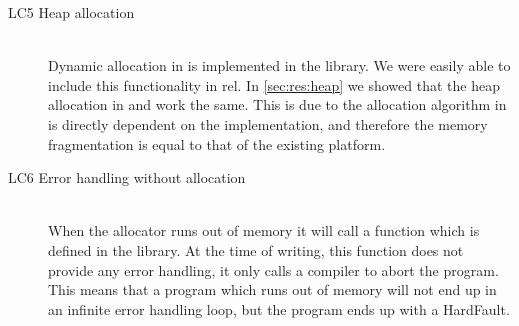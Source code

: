 \begin{description}
\item [LC5 Heap allocation] \hfill \\
  Dynamic allocation in {\rust} is implemented in the  library.
  We were easily able to include this functionality in \gls{rel}.
  In \autoref{sec:res:heap} we showed that the heap allocation in {\rust} and {\C} work the same.
  This is due to the allocation algorithm in {\rust} is directly dependent on the   implementation, and therefore the memory fragmentation is equal to that of the existing {\C} platform.

\item [LC6 Error handling without allocation] \hfill \\
  When the {\rust} allocator runs out of memory it will call a function which is defined in the  library.
  At the time of writing, this function does not provide any error handling, it only calls a compiler  to abort the program.
  This means that a {\rust} program which runs out of memory will not end up in an infinite error handling loop, but the program ends up with a HardFault.

\end{description}
